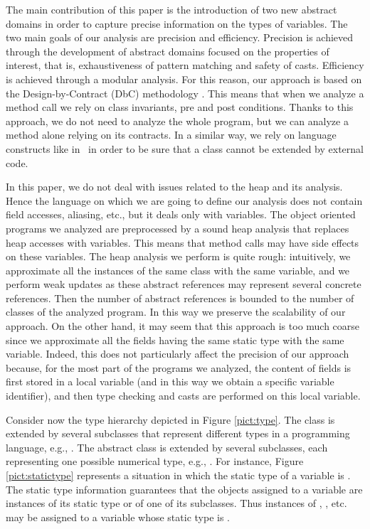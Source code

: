 \documentclass{llncs}
\begin{document}
The main contribution of this paper is the introduction of two new abstract domains in order to capture precise information on the types of variables. The two main goals of our analysis are precision and efficiency. Precision is achieved through the development of abstract domains focused on the properties of interest, that is, exhaustiveness of pattern matching and safety of casts. Efficiency is achieved through a modular analysis. For this reason, our approach is based on the Design-by-Contract (DbC) methodology \cite{meyer97}. This means that when we analyze a method call we rely on class invariants, pre and post conditions. Thanks to this approach, we do not need to analyze the whole program, but we can analyze a method alone relying on its contracts. In a similar way, we rely on language constructs like  in \Scala\ in order to be sure that a class cannot be extended by external code.

In this paper, we do not deal with issues related to the heap and its analysis. Hence the language on which we are going to define our analysis does not contain field accesses, aliasing, etc., but it deals only with variables. The object oriented programs we analyzed are preprocessed by a sound heap analysis that replaces heap accesses with variables. This means that method calls may have side effects on these variables. The heap analysis we perform is quite rough: intuitively, we approximate all the instances of the same class with the same variable, and we perform weak updates \cite{CWZ90} as these abstract references may represent several concrete references. Then the number of abstract references is bounded to the number of classes of the analyzed program. In this way we preserve the scalability of our approach. On the other hand, it may seem that this approach is too much coarse since we approximate all the fields having the same static type with the same variable. Indeed, this does not particularly affect the precision of our approach because, for the most part of the programs we analyzed, the content of fields is first stored in a local variable (and in this way we obtain a specific variable identifier), and then type checking and casts are performed on this local variable.

Consider now the type hierarchy depicted in Figure \ref{pict:type}. The class  is extended by several subclasses that represent different types in a programming language, e.g., . The abstract class  is extended by several subclasses, each representing one possible numerical type, e.g., . For instance, Figure \ref{pict:statictype} represents a situation in which the static type of a variable is . The static type information guarantees that the objects assigned to a variable are instances of its static type or of one of its subclasses. Thus instances of , , etc. may be assigned to a variable whose static type is .
\end{document}
